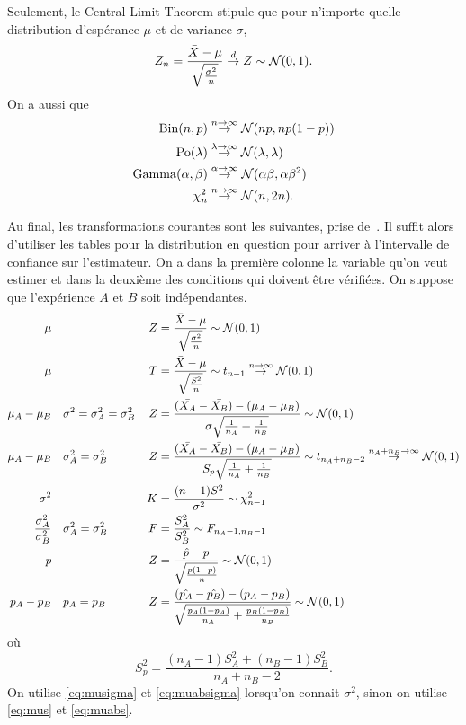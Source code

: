 Seulement, le Central Limit Theorem stipule que pour n'importe quelle distribution
d'espérance $\mu$ et de variance $\sigma$,
\[
  Z_n = \frac{\bar{X} - \mu}{\sqrt{\frac{\sigma^2}{n}}} \stackrel{d}{\to} Z \sim \mathcal{N}(0, 1).
\]
On a aussi que
\begin{align*}
  \operatorname{Bin}(n,p) & \stackrel{n\to\infty}{\to} \mathcal{N}(np,np(1-p))\\
  \operatorname{Po}(\lambda) & \stackrel{\lambda\to\infty}{\to} \mathcal{N}(\lambda,\lambda)\\
  \operatorname{Gamma}(\alpha,\beta) & \stackrel{\alpha\to\infty}{\to} \mathcal{N}(\alpha\beta,\alpha\beta^2)\\
  \chi_n^2 & \stackrel{n\to\infty}{\to} \mathcal{N}(n, 2n).
\end{align*}

Au final, les transformations courantes sont les suivantes, prise de~\cite[pp.~397,430,435]{wackerly2008mathematical}.
Il suffit alors d'utiliser les tables pour la distribution en question pour arriver à l'intervalle de confiance sur
l'estimateur.
On a dans la première colonne la variable qu'on veut estimer et
dans la deuxième des conditions qui doivent être vérifiées.
On suppose que l'expérience $A$ et $B$ soit indépendantes.
\begin{align}
  \label{eq:musigma}
  \mu & & Z & = \frac{\bar{X} - \mu}{\sqrt{\frac{\sigma^2}{n}}} \sim \N(0, 1)\\
  \label{eq:mus}
  \mu & & T & = \frac{\bar{X} - \mu}{\sqrt{\frac{S^2}{n}}} \sim t_{n-1} \stackrel{n \to \infty}{\to} \N(0,1)\\
  \label{eq:muabsigma}
  \mu_A - \mu_B & \quad \sigma^2 = \sigma_A^2 = \sigma_B^2 & Z & = \frac{(\bar{X_A} - \bar{X_B}) - (\mu_A - \mu_B)}{\sigma\sqrt{\frac{1}{n_A} + \frac{1}{n_B}}} \sim \N(0,1)\\
  \label{eq:muabs}
  \mu_A - \mu_B & \quad \sigma_A^2 = \sigma_B^2 & Z & = \frac{(\bar{X_A} - \bar{X_B}) - (\mu_A - \mu_B)}{S_p\sqrt{\frac{1}{n_A} + \frac{1}{n_B}}} \sim t_{n_A+n_B-2} \stackrel{n_A + n_B \to \infty}{\to} \N(0,1)\\
  \sigma^2 & & K & = \frac{(n-1)S^2}{\sigma^2} \sim \chi_{n-1}^2\\
  \label{eq:sigmaab}
  \frac{\sigma_A^2}{\sigma_B^2} & \quad \sigma_A^2 = \sigma_B^2 & F & = \frac{S_A^2}{S_B^2} \sim F_{n_A-1,n_B-1}\\ %
  \label{eq:p}
  p & & Z & = \frac{\hat{p} - p}{\sqrt{\frac{p(1-p)}{n}}} \sim \N(0, 1)\\
  \label{eq:pab}
  p_A - p_B & \quad p_A = p_B & Z & = \frac{(\hat{p_A} - \hat{p_B}) - (p_A - p_B)}{\sqrt{\frac{p_A(1-p_A)}{n_A} + \frac{p_B(1-p_B)}{n_B}}}
  \sim \N(0, 1)
\end{align}
où
\[ S_p^2 = \frac{(n_A-1)S_A^2 + (n_B-1)S_B^2}{n_A+n_B-2}. \]
On utilise \eqref{eq:musigma} et \eqref{eq:muabsigma} lorsqu'on connait $\sigma^2$,
sinon on utilise \eqref{eq:mus} et \eqref{eq:muabs}.


